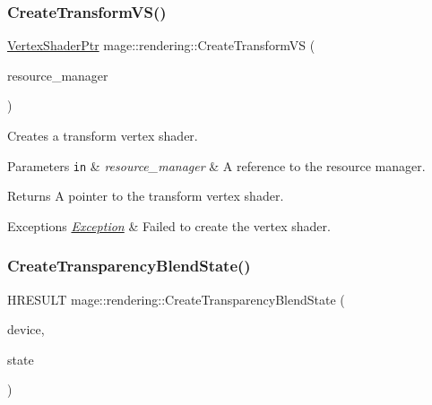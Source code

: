 \subsubsection{\texorpdfstring{Create\+Transform\+V\+S()}{CreateTransformVS()}}
{\footnotesize\ttfamily \mbox{\hyperlink{namespacemage_1_1rendering_aaf704b9c54a4181f4950a1761de69dda}{Vertex\+Shader\+Ptr}} mage\+::rendering\+::\+Create\+Transform\+VS (\begin{DoxyParamCaption}\item[{\mbox{\hyperlink{classmage_1_1rendering_1_1_resource_manager}{Resource\+Manager}} \&}]{resource\+\_\+manager }\end{DoxyParamCaption})}

Creates a transform vertex shader.


\begin{DoxyParams}[1]{Parameters}
\mbox{\tt in}  & {\em resource\+\_\+manager} & A reference to the resource manager. \\
\hline
\end{DoxyParams}
\begin{DoxyReturn}{Returns}
A pointer to the transform vertex shader. 
\end{DoxyReturn}

\begin{DoxyExceptions}{Exceptions}
{\em \mbox{\hyperlink{classmage_1_1_exception}{Exception}}} & Failed to create the vertex shader. \\
\hline
\end{DoxyExceptions}
\mbox{\label{namespacemage_1_1rendering_a97b9c14e5432d4a011a6531e4d1f212e}} 
\subsubsection{\texorpdfstring{Create\+Transparency\+Blend\+State()}{CreateTransparencyBlendState()}}
{\footnotesize\ttfamily H\+R\+E\+S\+U\+LT mage\+::rendering\+::\+Create\+Transparency\+Blend\+State (\begin{DoxyParamCaption}\item[{I\+D3\+D11\+Device \&}]{device,  }\item[{\mbox{\hyperlink{namespacemage_a8769f9d670d6b585ea306cb1062af94b}{Not\+Null}}$<$ I\+D3\+D11\+Blend\+State $\ast$$\ast$$>$}]{state }\end{DoxyParamCaption})\hspace{0.3cm}{\ttfamily [noexcept]}}

